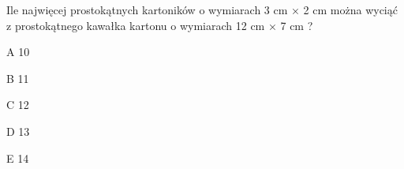 \begin{tresc}
Ile najwięcej prostokątnych kartoników o wymiarach 3 cm × 2 cm można wyciąć z prostokątnego kawałka kartonu o wymiarach 12 cm × 7 cm ?
\end{tresc}
\begin{wariant}{A} 10 \end{wariant}
\begin{wariant}{B} 11 \end{wariant}
\begin{wariant}{C} 12 \end{wariant}
\begin{wariant}{D} 13 \end{wariant}
\begin{wariant}{E} 14 \end{wariant}
